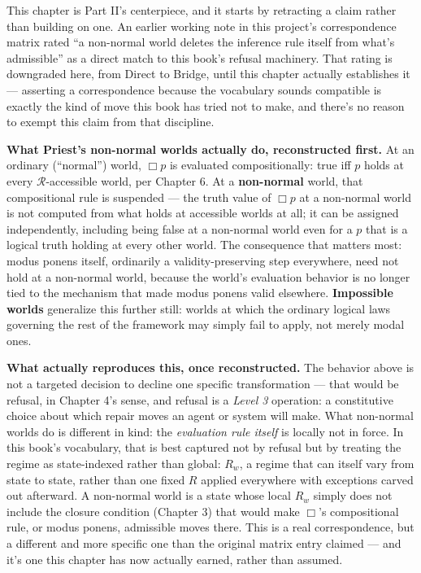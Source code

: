 This chapter is Part II's centerpiece, and it starts by retracting a
claim rather than building on one. An earlier working note in this
project's correspondence matrix rated ``a non-normal world deletes the
inference rule itself from what's admissible'' as a direct match to this
book's refusal machinery. That rating is downgraded here, from Direct to
Bridge, until this chapter actually establishes it --- asserting a
correspondence because the vocabulary sounds compatible is exactly the
kind of move this book has tried not to make, and there's no reason to
exempt this claim from that discipline.

\textbf{What Priest's non-normal worlds actually do, reconstructed first.} At
an ordinary (``normal'') world, \(\Box p\) is evaluated compositionally: true
iff \(p\) holds at every \(\mathcal{R}\)-accessible world, per Chapter 6. At
a \textbf{non-normal} world, that compositional rule is suspended --- the truth
value of \(\Box p\) at a non-normal world is not computed from what holds
at accessible worlds at all; it can be assigned independently, including
being false at a non-normal world even for a \(p\) that is a logical truth
holding at every other world. The consequence that matters most: modus
ponens itself, ordinarily a validity-preserving step everywhere, need
not hold at a non-normal world, because the world's evaluation behavior
is no longer tied to the mechanism that made modus ponens valid
elsewhere. \textbf{Impossible worlds} generalize this further still: worlds at
which the ordinary logical laws governing the rest of the framework may
simply fail to apply, not merely modal ones.

\textbf{What actually reproduces this, once reconstructed.} The behavior
above is not a targeted decision to decline one specific transformation
--- that would be refusal, in Chapter 4's sense, and refusal is a
\emph{Level 3} operation: a constitutive choice about which repair moves an
agent or system will make. What non-normal worlds do is different in
kind: the \emph{evaluation rule itself} is locally not in force. In this
book's vocabulary, that is best captured not by refusal but by treating
the regime as state-indexed rather than global: \(R_w\), a regime that can
itself vary from state to state, rather than one fixed \(R\) applied
everywhere with exceptions carved out afterward. A non-normal world is a
state whose local \(R_w\) simply does not include the closure condition
(Chapter 3) that would make \(\Box\)'s compositional rule, or modus ponens,
admissible moves there. This is a real correspondence, but a different
and more specific one than the original matrix entry claimed --- and it's
one this chapter has now actually earned, rather than assumed.

